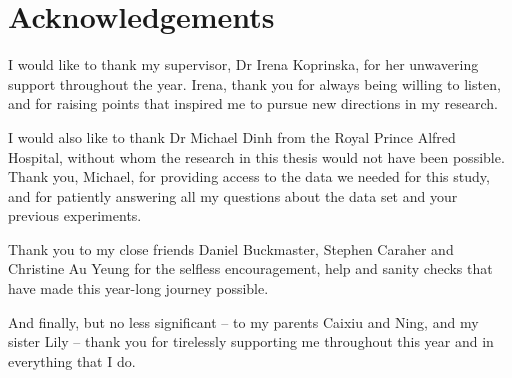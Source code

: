 \chapter*{Acknowledgements}

I would like to thank my supervisor, Dr Irena Koprinska, for her unwavering
support throughout the year. Irena, thank you for always being willing to
listen, and for raising points that inspired me to pursue new directions in
my research.

I would also like to thank Dr Michael Dinh from the Royal Prince Alfred
Hospital, without whom the research in this thesis would not have been
possible. Thank you,
Michael, for providing access to the data we needed for this study, and for
patiently answering all my questions about the data set and your previous
experiments.

Thank you to my close friends Daniel Buckmaster, Stephen Caraher and Christine
Au Yeung for the selfless encouragement, help and sanity checks that have
made this year-long journey possible.

And finally, but no less significant -- to my parents Caixiu and Ning, and
my sister Lily -- thank you for tirelessly supporting me throughout this year
and in everything that I do.
